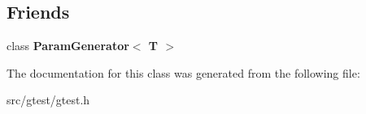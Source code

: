 \subsection*{Friends}
\begin{DoxyCompactItemize}
\item 
\mbox{\label{classtesting_1_1internal_1_1_param_iterator_ab73a355ae191f2f7eab54b65ca557714}} 
class {\bfseries Param\+Generator$<$ T $>$}
\end{DoxyCompactItemize}


The documentation for this class was generated from the following file\+:\begin{DoxyCompactItemize}
\item 
src/gtest/gtest.\+h\end{DoxyCompactItemize}
